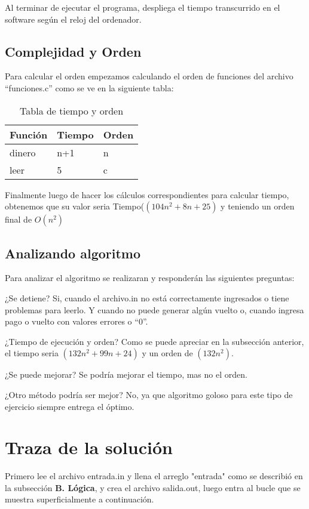 \documentclass[9pt,twocolumn,twoside]{optica}
\begin{document}
Al terminar de ejecutar el programa, despliega el tiempo transcurrido en el software según el reloj del ordenador.


\subsection{Complejidad y Orden}
Para calcular el orden empezamos calculando el orden de funciones del archivo “funciones.c” como se ve en la siguiente tabla:
\begin{table}
\centering
\caption{Tabla de tiempo y orden}
\label{my-label}
\begin{tabular}{|l|l|l|}
\hline
Función & Tiempo & Orden \\ \hline
dinero & n+1 & n  \\ \hline
leer & 5 & c \\ \hline
\end{tabular}
\end{table}

Finalmente luego de hacer los cálculos correspondientes para calcular tiempo, obtenemos que su valor seria Tiempo($ (104n^2+8n+25)  $ y teniendo un orden final de $ O(n^{2}) $

\subsection{Analizando algoritmo}

Para analizar el algoritmo se realizaran y responderán las siguientes preguntas:

¿Se detiene?
Si, cuando el archivo.in no está correctamente ingresados o tiene problemas para leerlo. Y cuando no puede generar algún vuelto o, cuando ingresa pago o vuelto con valores errores o “0”.

¿Tiempo de ejecución y orden?
Como se puede apreciar en la subsección anterior, el tiempo seria $ (132n^2+99n+24) $ y un orden de $ (132n^2) $.

¿Se puede mejorar?
Se podría mejorar el tiempo, mas no el orden.

¿Otro método podría ser mejor?
No, ya que algoritmo goloso para este tipo de ejercicio siempre entrega el óptimo.



\section{Traza de la solución}

Primero lee el archivo entrada.in y llena el arreglo "entrada" como se describió en la subsección \textbf{B. Lógica}, y crea el archivo salida.out, luego entra al bucle que se muestra superficialmente a continuación.
\end{document}
